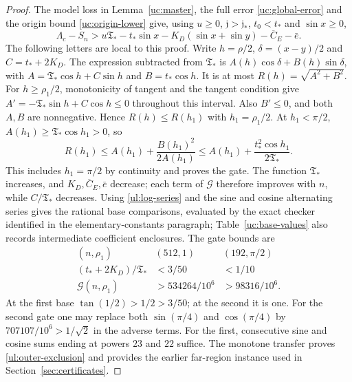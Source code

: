 \begin{proof}
The model loss in Lemma~\ref{uc:master}, the full error
\eqref{uc:global-error} and the origin bound \eqref{uc:origin-lower} give, using $u\geq0$, $\mathfrak j>\mathfrak j_*$,
$t_0<t_*$ and $\sin x\geq0$,
\[
 \Lambda_c-S_n>u\mathfrak T_*-t_*\sin x-K_D(\sin x+\sin y)
                         -\overline C_E-\bar e.
\]
The following letters are local to this proof. Write $h=\rho/2$, $\delta=(x-y)/2$ and $C=t_*+2K_D$.
The expression subtracted from $\mathfrak T_*$ is
$A(h)\cos\delta+B(h)\sin\delta$, with
$A=\mathfrak T_*\cos h+C\sin h$ and $B=t_*\cos h$.
It is at most $R(h)=\sqrt{A^2+B^2}$. For $h\geq\rho_1/2$,
monotonicity of tangent and the tangent condition give
$A'=-\mathfrak T_*\sin h+C\cos h\leq0$ throughout this interval.
Also $B'\leq0$, and both $A,B$ are nonnegative.
Hence $R(h)\leq R(h_1)$ with $h_1=\rho_1/2$.
At $h_1<\pi/2$, $A(h_1)\geq\mathfrak T_*\cos h_1>0$, so
\[
 R(h_1)\leq A(h_1)+\frac{B(h_1)^2}{2A(h_1)}
       \leq A(h_1)+\frac{t_*^2\cos h_1}{2\mathfrak T_*}.
\]
This includes $h_1=\pi/2$ by continuity and proves the gate.
The function $\mathfrak T_*$ increases, and $K_D,\overline C_E,\bar e$
decrease; each term of $\mathcal G$ therefore improves with $n$, while
$C/\mathfrak T_*$ decreases. Using \eqref{ul:log-series} and the sine and
cosine alternating series gives the rational base comparisons, evaluated by the exact checker
identified in the elementary-constants paragraph; Table~\ref{uc:base-values}
also records intermediate coefficient enclosures. The gate bounds are
\[
 \begin{array}{ccc}
 (n,\rho_1)&(512,1)&(192,\pi/2)\\ \hline
 (t_*+2K_D)/\mathfrak T_*&<3/50&<1/10\\
 \mathcal G(n,\rho_1)&>534264/10^6&>98316/10^6.
 \end{array}
\]
At the first base $\tan(1/2)>1/2>3/50$; at the second it is one.
For the second gate one may replace both $\sin(\pi/4)$ and
$\cos(\pi/4)$ by $707107/10^6>1/\sqrt2$ in the adverse terms.
For the first, consecutive sine and cosine sums ending at powers
$23$ and $22$ suffice. The monotone transfer proves
\eqref{ul:outer-exclusion} and provides the earlier far-region
instance used in Section~\ref{sec:certificates}.
\end{proof}

